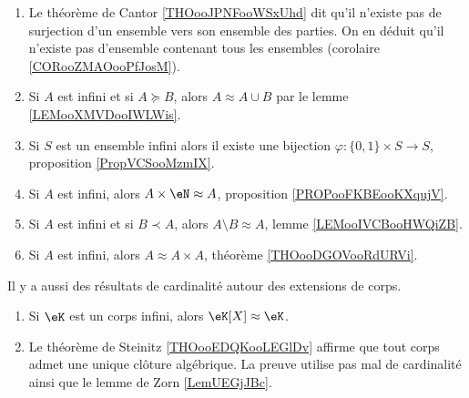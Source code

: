 \begin{enumerate}
	\item
	      Le théorème de Cantor \ref{THOooJPNFooWSxUhd} dit qu'il n'existe pas de surjection d'un ensemble vers son ensemble des parties. On en déduit qu'il n'existe pas d'ensemble contenant tous les ensembles (corolaire \ref{CORooZMAOooPfJosM}).
	\item
	      Si \( A\) est infini et si \( A\succeq B\), alors \( A\approx A\cup B\) par le lemme \ref{LEMooXMVDooIWLWis}.
	\item
	      Si \( S\) est un ensemble infini alors il existe une bijection \( \varphi\colon \{ 0,1 \}\times S\to S\), proposition \ref{PropVCSooMzmIX}.
	\item
	      Si \( A\) est infini, alors \( A\times \eN\approx A\), proposition \ref{PROPooFKBEooKXqujV}.
	\item
	      Si \( A\) est infini et si \( B\prec A\), alors \( A\setminus B\approx A\), lemme \ref{LEMooIVCBooHWQiZB}.
	\item
	      Si \( A\) est infini, alors \( A\approx A\times A\), théorème \ref{THOooDGOVooRdURVi}.
\end{enumerate}

Il y a aussi des résultats de cardinalité autour des extensions de corps.
\begin{enumerate}
	\item
	      Si \( \eK\) est un corps infini, alors \( \eK[X]\approx \eK\).
	\item
	      Le théorème de Steinitz \ref{THOooEDQKooLEGlDv} affirme que tout corps admet une unique clôture algébrique. La preuve utilise pas mal de cardinalité ainsi que le lemme de Zorn \ref{LemUEGjJBc}.
\end{enumerate}

